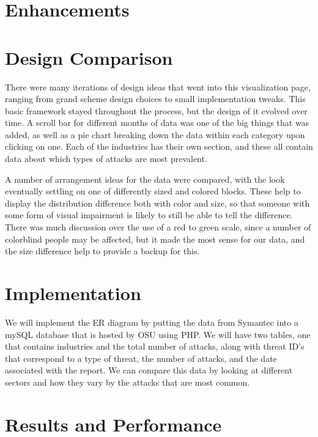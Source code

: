 \documentclass[journal]{vgtc}                %
\begin{document}
\section{Enhancements}

\section{Design Comparison}
There were many iterations of design ideas that went into this visualization page, ranging from grand scheme design choices to small implementation tweaks.
This basic framework stayed throughout the process, but the design of it evolved over time. 
A scroll bar for different months of data was one of the big things that was added, as well as a pie chart breaking down the data within each category upon clicking on one.
Each of the industries has their own section, and these all contain data about which types of attacks are most prevalent.

A number of arrangement ideas for the data were compared, with the look eventually settling on one of differently sized and colored blocks.
These help to display the distribution difference both with color and size, so that someone with some form of visual impairment is likely to still be able to tell the difference.
There was much discussion over the use of a red to green scale, since a number of colorblind people may be affected, but it made the most sense for our data, and the size difference help to provide a backup for this.

\section{Implementation}
We will implement the ER diagram by putting the data from Symantec into a mySQL database that is hosted by OSU using PHP.
We will have two tables, one that contains industries and the total number of attacks, along with threat ID’s that correspond to a type of threat, the number of attacks, and the date associated with the report. 
We can compare this data by looking at different sectors and how they vary by the attacks that are most common.

\section{Results and Performance}
\end{document}
